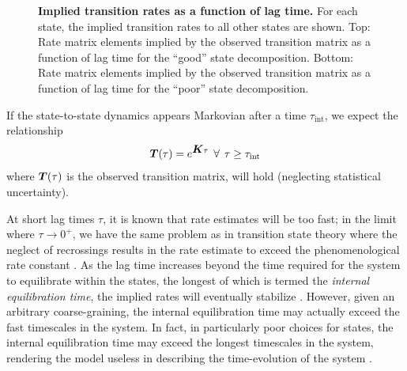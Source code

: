 \begin{figure}[tbp]
  \begin{center}
  \end{center}
  \caption{
  {\bf Implied transition rates as a function of lag time.}  
  For each state, the implied transition rates to all other states are shown.
  Top: Rate matrix elements implied by the observed transition matrix as a function of lag time for the ``good'' state decomposition.
  Bottom: Rate matrix elements implied by the observed transition matrix as a function of lag time for the ``poor'' state decomposition.
  }
  \label{validation:figure:implied-rates}
\end{figure}

If the state-to-state dynamics appears Markovian after a time $\tau_{\mathrm{int}}$, we expect the relationship
\begin{equation}
{\mbox{\boldmath{$T$}}}(\tau) = e^{{\mbox{\boldmath{$K$}}} \tau} \:\:\forall \:\: \tau \ge \tau_{\mathrm{int}} \label{validation:equation:relation-between-transition-and-rate-matrix}
\end{equation}
where ${\mbox{\boldmath{$T$}}}(\tau)$ is the observed transition matrix, will hold (neglecting statistical uncertainty).

At short lag times $\tau$, it is known that rate estimates will be too fast; 
in the limit where $\tau \rightarrow 0^+$, we have the same problem as in transition state theory where the neglect of recrossings results in the rate estimate to exceed the phenomenological rate constant \cite{chandler:1978a}.  
As the lag time increases beyond the time required for the system to equilibrate within the states, the longest of which is termed the \emph{internal equilibration time}, the implied rates will eventually stabilize \cite{chodera:jcp:2006}.  
However, given an arbitrary coarse-graining, the internal equilibration time may actually exceed the fast timescales in the system. 
In fact, in particularly poor choices for states, the internal equilibration time may exceed the longest timescales in the system, rendering the model useless in describing the time-evolution of the system \cite{swope:2004a}.

